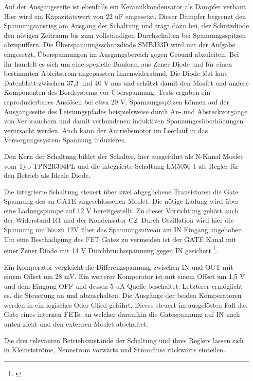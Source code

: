 Auf der Ausgangsseite ist ebenfalls ein Keramikkondensator als Dämpfer verbaut. Hier wird ein Kapazitätswert von 22 uF eingesetzt. Dieser Dämpfer begrenzt den Spannungsanstieg am Ausgang der Schaltung und trägt dazu bei, der Schutzdiode den nötigen Zeitraum bis zum vollständigen Durchschalten bei Spannungsspitzen abzupuffern.
Die Überspannungsschutzdiode SMBJ33D wird mit der Aufgabe eingesetzt, Überspannungen im Ausgangsbereich gegen Ground abzuleiten. Bei ihr handelt es sich um eine spezielle Bauform aus Zener Diode und für einen bestimmten Ableitstrom angepassten Innenwiderstand. Die Diode löst laut Datenblatt zwischen 37,3 und 40 V aus und schützt damit den Mosfet und andere Komponenten des Bordsystems vor Überspannung. Tests ergaben ein reproduzierbares Auslösen bei  etwa 29 V. Spannungsspitzen können auf der Ausgangsseite des Leistungspfades beispielsweise durch An- und Absteckvorgänge von Verbrauchern und damit verbundenen induktiven Spannungesüberhöhungen verursacht werden. Auch kann der Antriebsmotor im Leerlauf in das Versorgungssystem Spannung induzieren.

Den Kern der Schaltung bildet der Schalter, hier ausgeführt als N-Kanal Mosfet vom Typ TPN2R304PL und die integrierte Schaltung LM5050-1 als Regler für den Betrieb als Ideale Diode.

Die integrierte Schaltung steuert über zwei abgeglichene Transistoren die Gate Spannung des an GATE angeschlossenen Mosfet. Die nötige Ladung wird über eine Ladungspumpe auf 12 V bereitgestellt. Zu dieser Vorrichtung gehört auch der Widerstand R1 und der Kondensator C2.
Durch Oszillation wird hier die Spannung um bis zu 12V  über das Spannungsniveau am IN Eingang angehoben. Um eine Beschädigung des FET Gates zu vermeiden ist der GATE Kanal mit einer Zener Diode mit 14 V Durchbruchsspannung gegen IN gesichert \footnote{\cite[Seite~12.]{LM5050-1}}.

Ein Komperator vergleicht die Differenzspannung zwischen IN und OUT mit einem Offset um 28 mV. Ein weiterer Komperator ist mit einem Offset um 1,5 V und dem Eingang OFF und dessen 5 uA Quelle beschaltet. Letzterer ermöglicht es, die Steuerung an und abzuschalten. Die Ausgänge der beiden Komperatoren werden in ein logisches Oder Glied geführt. Dieses steuert im ausgelösten Fall das Gate eines internen FETs, an welcher daraufhin die Gatespannung auf IN nach unten zieht und den externen Mosfet abschaltet. 

Die drei relevanten Betriebszustände der Schaltung und ihres Reglers lassen sich in Kleinstströme, Nennstrom vorwärts und Stromfluss rückwärts einteilen.

